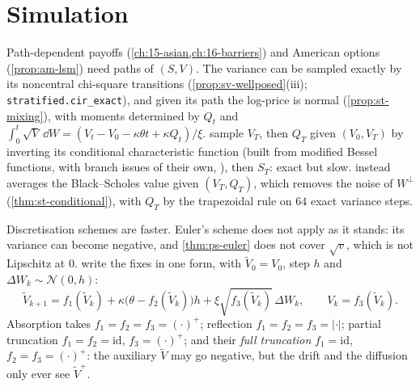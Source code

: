 
\section{Simulation}\label{sec:sv-simulation}

Path-dependent payoffs (\cref{ch:15-asian,ch:16-barriers}) and American options (\cref{prop:am-lsm}) need
paths of $(S,V)$. The variance can be sampled exactly by its noncentral chi-square transitions
(\cref{prop:sv-wellposed}(iii); \texttt{stratified.cir\_exact}), and given its path the log-price is normal
(\cref{prop:st-mixing}), with moments determined by $Q_t$ and
$\int_0^t\sqrt V\,\dd W=(V_t-V_0-\kappa\theta t+\kappa Q_t)/\xi$. \textcite{broadie-kaya} sample $V_T$, then $Q_T$ given
$(V_0,V_T)$ by inverting its conditional characteristic function (built from modified Bessel functions,
with branch issues of their own, \citealp[Section~5.3]{lord-kahl-wp}), then $S_T$: exact but slow.
 instead averages the Black--Scholes value given $(V_T,Q_T)$, which removes the noise
of $W^\perp$ (\cref{thm:st-conditional}), with $Q_T$ by the trapezoidal rule on $64$ exact variance steps.

Discretisation schemes are faster. Euler's scheme does not apply as it stands: its variance can become
negative, and \cref{thm:ps-euler} does not cover $\sqrt v$, which is not Lipschitz at $0$.
\textcite{lord-koekkoek-vandijk} write the fixes in one form, with $\tilde V_0=V_0$, step $h$ and
$\Delta W_k\sim\mathcal N(0,h)$:
\[
  \tilde V_{k+1}=f_1(\tilde V_k)+\kappa\big(\theta-f_2(\tilde V_k)\big)h+\xi\sqrt{f_3(\tilde V_k)}\,\Delta W_k,\qquad V_k=f_3(\tilde V_k).
\]
Absorption takes $f_1=f_2=f_3=(\cdot)^+$; reflection $f_1=f_2=f_3=|\cdot|$; partial truncation $f_1=f_2=\mathrm{id}$,
$f_3=(\cdot)^+$; and their \emph{full truncation} $f_1=\mathrm{id}$, $f_2=f_3=(\cdot)^+$: the auxiliary
$\tilde V$ may go negative, but the drift and the diffusion only ever see $\tilde V^+$.

